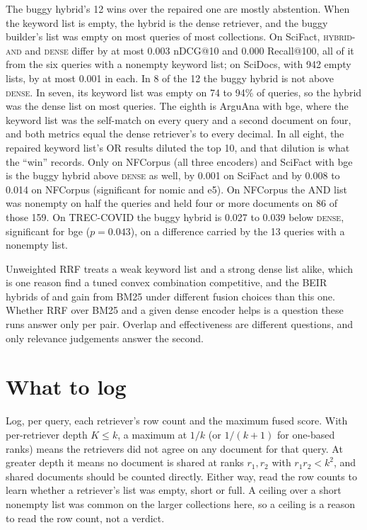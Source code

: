 \documentclass[11pt]{article}
\begin{document}
The buggy hybrid's 12 wins over the repaired one are mostly abstention. When the keyword list is empty, the hybrid is the dense retriever, and the buggy builder's list was empty on most queries of most collections. On SciFact, \textsc{hybrid-and} and \textsc{dense} differ by at most 0.003 nDCG@10 and 0.000 Recall@100, all of it from the six queries with a nonempty keyword list; on SciDocs, with 942 empty lists, by at most 0.001 in each. In 8 of the 12 the buggy hybrid is not above \textsc{dense}. In seven, its keyword list was empty on 74 to 94\% of queries, so the hybrid was the dense list on most queries. The eighth is ArguAna with bge, where the keyword list was the self-match on every query and a second document on four, and both metrics equal the dense retriever's to every decimal. In all eight, the repaired keyword list's OR results diluted the top 10, and that dilution is what the ``win'' records. Only on NFCorpus (all three encoders) and SciFact with bge is the buggy hybrid above \textsc{dense} as well, by 0.001 on SciFact and by 0.008 to 0.014 on NFCorpus (significant for nomic and e5). On NFCorpus the AND list was nonempty on half the queries and held four or more documents on 86 of those 159. On TREC-COVID the buggy hybrid is 0.027 to 0.039 below \textsc{dense}, significant for bge ($p = 0.043$), on a difference carried by the 13 queries with a nonempty list.

Unweighted RRF treats a weak keyword list and a strong dense list alike, which is one reason \citet{bruch2023fusion} find a tuned convex combination competitive, and the BEIR hybrids of \citet{chen2022hybrid} and \citet{wang2021interpolation} gain from BM25 under different fusion choices than this one. Whether RRF over BM25 and a given dense encoder helps is a question these runs answer only per pair. Overlap and effectiveness are different questions, and only relevance judgements answer the second.

\section{What to log}
\label{sec:log}

Log, per query, each retriever's row count and the maximum fused score. With per-retriever depth $K \le k$, a maximum at $1/k$ (or $1/(k+1)$ for one-based ranks) means the retrievers did not agree on any document for that query. At greater depth it means no document is shared at ranks $r_1, r_2$ with $r_1 r_2 < k^2$, and shared documents should be counted directly. Either way, read the row counts to learn whether a retriever's list was empty, short or full. A ceiling over a short nonempty list was common on the larger collections here, so a ceiling is a reason to read the row count, not a verdict.
\end{document}
